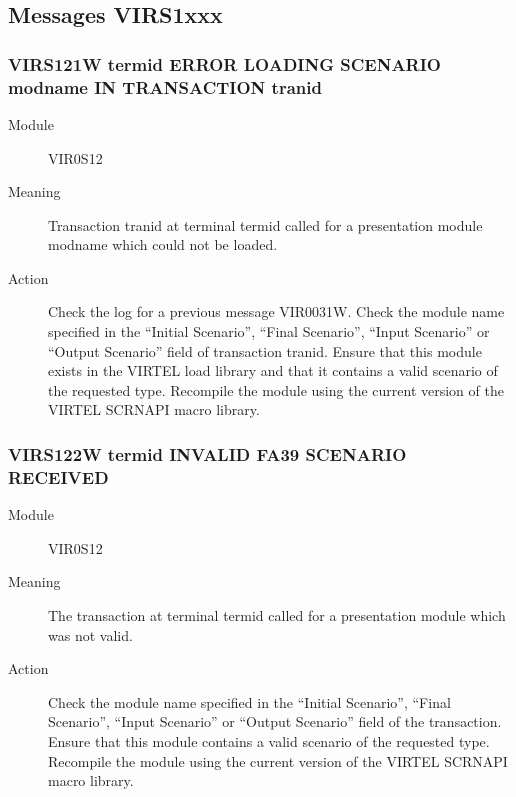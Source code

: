 \documentclass[letterpaper,10pt,english]{sphinxmanual}
\begin{document}
\subsection{Messages VIRS1xxx}
\label{\detokenize{messages:messages-virs1xxx}}

\subsubsection{VIRS121W termid ERROR LOADING SCENARIO modname IN TRANSACTION tranid}
\label{\detokenize{messages:virs121w-termid-error-loading-scenario-modname-in-transaction-tranid}}\begin{description}
\item[{Module}] \leavevmode
VIR0S12

\item[{Meaning}] \leavevmode
Transaction tranid at terminal termid called for a presentation module modname which could not be loaded.

\item[{Action}] \leavevmode
Check the log for a previous message VIR0031W. Check the module name specified in the “Initial Scenario”, “Final Scenario”, “Input Scenario” or “Output Scenario” field of transaction tranid. Ensure that this module exists in the VIRTEL load library and that it contains a valid scenario of the requested type. Recompile the module using the current version of the VIRTEL SCRNAPI macro library.

\end{description}


\subsubsection{VIRS122W termid INVALID FA39 SCENARIO RECEIVED}
\label{\detokenize{messages:virs122w-termid-invalid-fa39-scenario-received}}\begin{description}
\item[{Module}] \leavevmode
VIR0S12

\item[{Meaning}] \leavevmode
The transaction at terminal termid called for a presentation module which was not valid.

\item[{Action}] \leavevmode
Check the module name specified in the “Initial Scenario”, “Final Scenario”, “Input Scenario” or “Output Scenario” field of the transaction. Ensure that this module contains a valid scenario of the requested type. Recompile the module using the current version of the VIRTEL SCRNAPI macro library.

\end{description}
\end{document}
